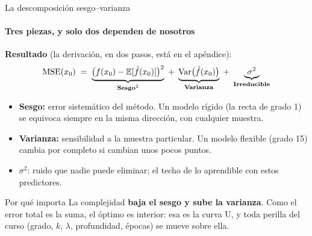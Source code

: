 \documentclass{beamer}
\newcommand{\E}{\mathbb{E}}
\newcommand{\Var}{\mathrm{Var}}
\newcommand{\1}{\mathbb{I}}
\newcommand{\MSE}{\mathrm{MSE}}
\begin{document}
\begin{frame}{La descomposición sesgo--varianza}
\framesubtitle{Tres piezas, y solo dos dependen de nosotros}
\small
\textbf{Resultado} (la derivación, en dos pasos, está en el apéndice):
\[ \MSE(x_0) \;=\; \underbrace{\big(f(x_0) - \E[\hat{f}(x_0)]\big)^2}_{\text{\textbf{Sesgo}}^2} \;+\; \underbrace{\Var\big(\hat{f}(x_0)\big)}_{\text{\textbf{Varianza}}} \;+\; \underbrace{\sigma^2}_{\text{\textbf{Irreducible}}} \]
\pause
\vspace{0.1cm}
\begin{itemize}\itemsep5pt
  \item \textbf{Sesgo:} error sistemático del método. Un modelo rígido (la recta de grado 1) se equivoca siempre en la misma dirección, con cualquier muestra.
  \item \textbf{Varianza:} sensibilidad a la muestra particular. Un modelo flexible (grado 15) cambia por completo si cambian unos pocos puntos.
  \item $\sigma^2$: ruido que nadie puede eliminar; el techo de lo aprendible con estos predictores. \pause
\end{itemize}

\begin{block}{Por qué importa}
La complejidad \textbf{baja el sesgo y sube la varianza}. Como el error total es la suma, el óptimo es interior: esa es la curva U, y toda perilla del curso (grado, $k$, $\lambda$, profundidad, épocas) se mueve sobre ella.
\end{block}
\end{frame}
\end{document}
